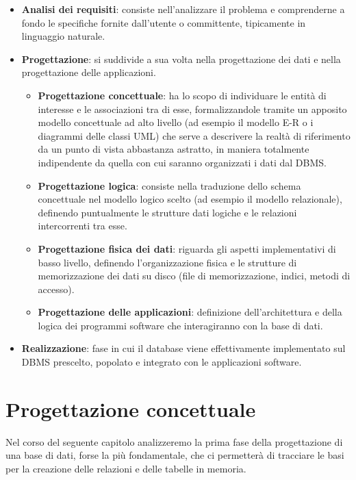 \documentclass[12pt]{report}
\begin{document}
	\begin{itemize}
		\item \textbf{Analisi dei requisiti}: consiste nell'analizzare il problema e comprenderne a fondo le specifiche fornite dall'utente o committente, tipicamente in linguaggio naturale.
		
		\item \textbf{Progettazione}: si suddivide a sua volta nella progettazione dei dati e nella progettazione delle applicazioni.
		\begin{itemize}
			\item \textbf{Progettazione concettuale}: ha lo scopo di individuare le entità di interesse e le associazioni tra di esse, formalizzandole tramite un apposito modello concettuale ad alto livello (ad esempio il modello E-R o i diagrammi delle classi UML) che serve a descrivere la realtà di riferimento da un punto di vista abbastanza astratto, in maniera totalmente indipendente da quella con cui saranno organizzati i dati dal DBMS.
			
			\item \textbf{Progettazione logica}: consiste nella traduzione dello schema concettuale nel modello logico scelto (ad esempio il modello relazionale), definendo puntualmente le strutture dati logiche e le relazioni intercorrenti tra esse.
			
			\item \textbf{Progettazione fisica dei dati}: riguarda gli aspetti implementativi di basso livello, definendo l'organizzazione fisica e le strutture di memorizzazione dei dati su disco (file di memorizzazione, indici, metodi di accesso).
			
			\item \textbf{Progettazione delle applicazioni}: definizione dell'architettura e della logica dei programmi software che interagiranno con la base di dati.
		\end{itemize}
		
		\item \textbf{Realizzazione}: fase in cui il database viene effettivamente implementato sul DBMS prescelto, popolato e integrato con le applicazioni software.
	\end{itemize}
	
	\chapter{Progettazione concettuale}
	Nel corso del seguente capitolo analizzeremo la prima fase della progettazione di una base di dati, forse la più fondamentale, che ci permetterà di tracciare le basi per la creazione delle relazioni e delle tabelle in memoria.
	
\end{document}
